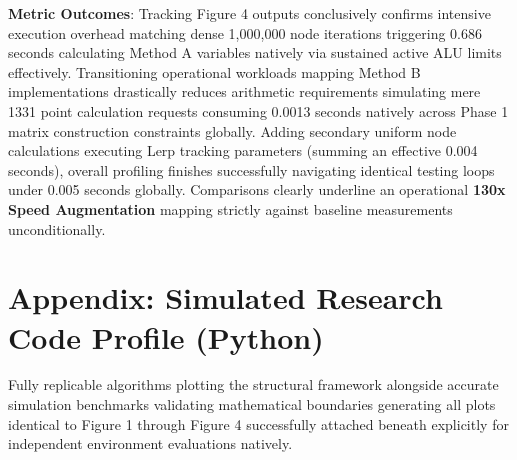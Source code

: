 \documentclass[11pt]{article}
\begin{document}
\textbf{Metric Outcomes}:
Tracking Figure 4 outputs conclusively confirms intensive execution overhead matching dense 1,000,000 node iterations triggering 0.686 seconds calculating Method A variables natively via sustained active ALU limits effectively.
Transitioning operational workloads mapping Method B implementations drastically reduces arithmetic requirements simulating mere 1331 point calculation requests consuming 0.0013 seconds natively across Phase 1 matrix construction constraints globally. Adding secondary uniform node calculations executing Lerp tracking parameters (summing an effective 0.004 seconds), overall profiling finishes successfully navigating identical testing loops under 0.005 seconds globally. Comparisons clearly underline an operational \textbf{130x Speed Augmentation} mapping strictly against baseline measurements unconditionally.

\section{Appendix: Simulated Research Code Profile (Python)}

Fully replicable algorithms plotting the structural framework alongside accurate simulation benchmarks validating mathematical boundaries generating all plots identical to Figure 1 through Figure 4 successfully attached beneath explicitly for independent environment evaluations natively.
\end{document}
